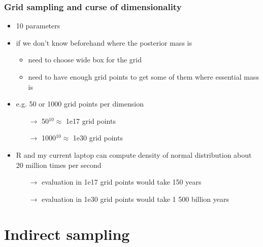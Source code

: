 \documentclass[10pt]{beamer}
\begin{document}
\begin{frame}
\frametitle{Grid sampling and curse of dimensionality}

  \begin{itemize}
      \item 10 parameters
      \item if we don't know beforehand where the posterior mass is
        \begin{itemize}
          \item need to choose wide box for the grid
          \item need to have enough grid points to get some of them
            where essential mass is
        \end{itemize}
      \item e.g. 50 or 1000 grid points per dimension
        \begin{itemize}
        \item[$\rightarrow$] 50$^{10} \approx$ 1e17 grid points
        \item[$\rightarrow$] 1000$^{10} \approx$ 1e30 grid points
        \end{itemize}
      \pause
      \item R and my current laptop can compute density of normal
        distribution about 20 million times per second
        \begin{itemize}
        \item[$\rightarrow$] evaluation in 1e17 grid points would take
           150 years %
        \item[$\rightarrow$] evaluation in 1e30 grid points would take
           1 500 billion years %
        \end{itemize}
 \end{itemize}

\end{frame}

\section{Indirect sampling}
\frame{\sectionpage}
\end{document}
